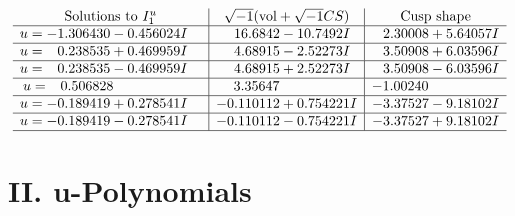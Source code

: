 \documentclass[1p]{elsarticle_modified}
\theoremstyle{definition}
\newcommand{\I}{\sqrt{-1}}
\begin{document}
$$\begin{array}{c|c|c}
\text{Solutions to }I^u_{1}& \I (\text{vol} + \sqrt{-1}CS) & \text{Cusp shape}\\
 \hline 
\begin{aligned}
u &= -1.306430 - 0.456024 I\end{aligned}
 & \phantom{-}16.6842 - 10.7492 I & \phantom{-}2.30008 + 5.64057 I \\ \hline\begin{aligned}
u &= \phantom{-}0.238535 + 0.469959 I\end{aligned}
 & \phantom{-}4.68915 - 2.52273 I & \phantom{-}3.50908 + 6.03596 I \\ \hline\begin{aligned}
u &= \phantom{-}0.238535 - 0.469959 I\end{aligned}
 & \phantom{-}4.68915 + 2.52273 I & \phantom{-}3.50908 - 6.03596 I \\ \hline\begin{aligned}
u &= \phantom{-}0.506828\phantom{ +0.000000I}\end{aligned}
 & \phantom{-}3.35647\phantom{ +0.000000I} & -1.00240\phantom{ +0.000000I} \\ \hline\begin{aligned}
u &= -0.189419 + 0.278541 I\end{aligned}
 & -0.110112 + 0.754221 I & -3.37527 - 9.18102 I \\ \hline\begin{aligned}
u &= -0.189419 - 0.278541 I\end{aligned}
 & -0.110112 - 0.754221 I & -3.37527 + 9.18102 I\\
 \hline 
 \end{array}$$\newpage
\newpage\renewcommand{\arraystretch}{1}
\centering \section*{ II. u-Polynomials}
\end{document}
